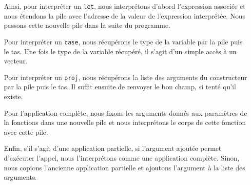 \documentclass{rapportECL}
\begin{document}
\medskip

Ainsi, pour interpréter un \verb|let|, nous interprétons d'abord l'expression associée et nous étendons la pile avec l'adresse de la valeur de l'expression interprétée. Nous passons cette nouvelle pile dans la suite du programme.


Pour interpréter un \verb|case|, nous récupérons le type de la variable par la pile puis le tas.
Une fois le type de la variable récupéré, il s'agit d'un simple accès à un vecteur.

Pour interpréter un \verb|proj|, nous récupérons la liste des arguments du constructeur par la pile puis le tas. Il suffit ensuite de renvoyer le bon champ, si tenté qu'il existe.


Pour l'application complète, nous fixons les arguments donnés aux paramètres de la fonctions dans une nouvelle pile et nous interprétons le corps de cette fonction avec cette pile.


Enfin, s'il s'agit d'une application partielle, si l'argument ajoutée permet d'exécuter l'appel, nous l'interprétons comme une application complète. Sinon, nous copions l'ancienne application partielle et ajoutons l'argument à la liste des arguments.
\end{document}
